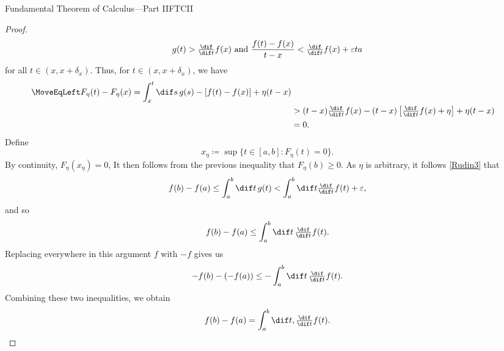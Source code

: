 \begin{thm}{Fundamental Theorem of Calculus---Part II}{FTCII}
\begin{proof}
\begin{equation}
g(t)>\tfrac{\dif}{\dif t}f(x)\text{ and }\frac{f(t)-f(x)}{t-x}<\tfrac{\dif}{\dif t}f(x)+\varepsilon ta
\end{equation}
for all $t\in (x,x+\delta _x)$.  Thus, for $t\in (x,x+\delta _x)$, we have
\begin{equation*}
\begin{split}
\MoveEqLeft
F_\eta (t)-F_\eta (x)=\int _x^t\dif s\, g(s)-[f(t)-f(x)]+\eta (t-x) \\
& >(t-x)\tfrac{\dif}{\dif t}f(x)-(t-x)\left[ \tfrac{\dif}{\dif t}f(x)+\eta \right] +\eta (t-x) \\
& =0.
\end{split}
\end{equation*}
Define
\begin{equation}
x_\eta \coloneqq \sup \{ t\in [a,b]:F_\eta (t)=0\} .
\end{equation}
By continuity, $F_\eta (x_\eta )=0$,   It then follows from the previous inequality that $F_\eta (b)\geq 0$.  As $\eta$ is arbitrary, it follows \eqref{Rudin3} that
\begin{equation}
f(b)-f(a)\leq \int _a^b\dif t\, g(t)<\int _a^b\dif t\tfrac{\dif}{\dif t}f(t)+\varepsilon ,
\end{equation}
and so
\begin{equation}
f(b)-f(a)\leq \int _a^b\dif t\, \tfrac{\dif}{\dif t}f(t).
\end{equation}
Replacing everywhere in this argument $f$ with $-f$ gives us
\begin{equation}
-f(b)-(-f(a))\leq -\int _a^b\dif t\, \tfrac{\dif}{\dif t}f(t).
\end{equation}
Combining these two inequalities, we obtain
\begin{equation}
f(b)-f(a)=\int _a^b\dif t, \tfrac{\dif}{\dif t}f(t).
\end{equation}
\end{proof}
\end{thm}


